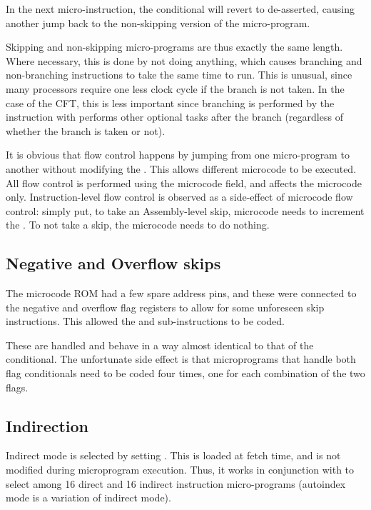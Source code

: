 In the next micro-instruction, the  conditional will revert
to de-asserted, causing another jump back to the non-skipping version
of the micro-program.

Skipping and non-skipping micro-programs are thus exactly the same
length. Where necessary, this is done by not doing anything, which
causes branching and non-branching instructions to take the same time
to run. This is unusual, since many processors require one less clock
cycle if the branch is not taken. In the case of the CFT, this is less
important since branching is performed by the  instruction
with performs other optional tasks after the branch (regardless of
whether the branch is taken or not).

It is obvious that flow control happens by jumping from one
micro-program to another without modifying the \UPC{}. This allows
different microcode to be executed. All flow control is performed
using the \OPIF{} microcode field, and affects the microcode
only. Instruction-level flow control is observed as a side-effect of
microcode flow control: simply put, to take an Assembly-level skip,
microcode needs to increment the \PC{}. To not take a skip, the
microcode needs to do nothing.

\subsection{Negative and Overflow skips}

The microcode ROM had a few spare address pins, and these were
connected to the negative and overflow flag registers to allow for
some unforeseen skip instructions. This allowed the  and
 sub-instructions to be coded.

These are handled and behave in a way almost identical to that of the
 conditional. The unfortunate side effect is that
microprograms that handle both flag conditionals need to be coded four
times, one for each combination of the two flags.

\subsection{Indirection}

Indirect mode is selected by setting . This is loaded at fetch
time, and is not modified during microprogram execution. Thus, it
works in conjunction with  to select among 16 direct and 16
indirect instruction micro-programs (autoindex mode is a variation of
indirect mode).

